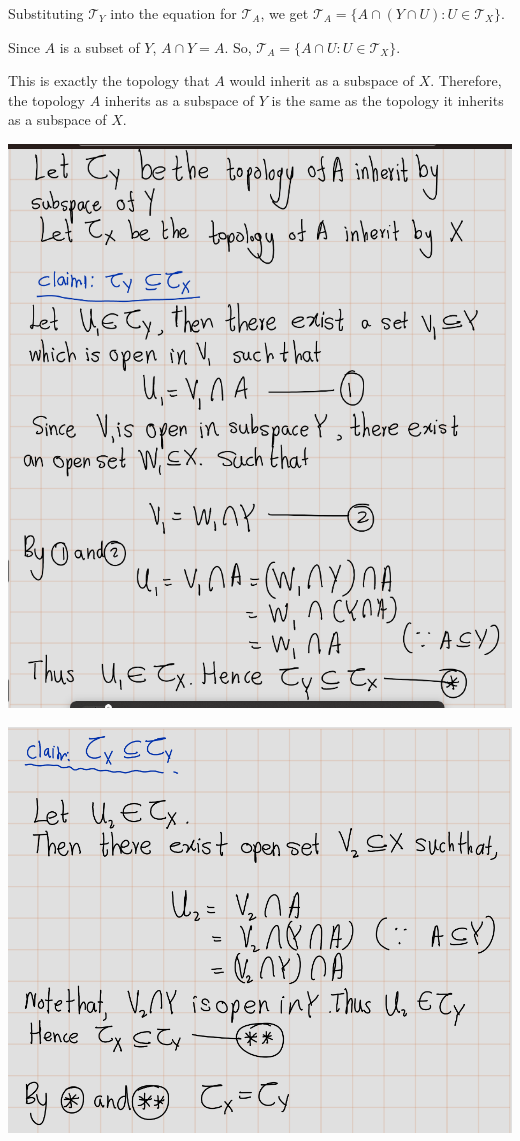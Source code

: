 \documentclass[
]{book}
\theoremstyle{definition}
\theoremstyle{definition}
\theoremstyle{definition}
\theoremstyle{definition}
\theoremstyle{remark}
\begin{document}
Substituting \(\mathcal{T}_Y\) into the equation for \(\mathcal{T}_A\), we get \(\mathcal{T}_A = \{ A \cap (Y \cap U) : U \in \mathcal{T}_X \}\).

Since \(A\) is a subset of \(Y\), \(A \cap Y = A\). So, \(\mathcal{T}_A = \{ A \cap U : U \in \mathcal{T}_X \}\).

This is exactly the topology that \(A\) would inherit as a subspace of \(X\). Therefore, the topology \(A\) inherits as a subspace of \(Y\) is the same as the topology it inherits as a subspace of \(X\).

\includegraphics{figures/Exercises/Ex 2.16/ex1-1.png}

\includegraphics{figures/Exercises/Ex 2.16/ex1-2.png}
\end{document}
